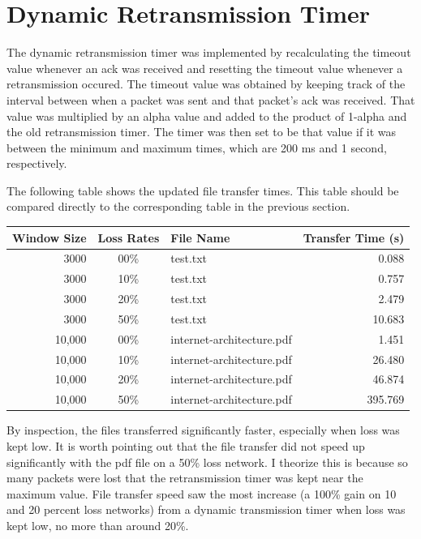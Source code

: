 \documentclass[11pt]{article}
\begin{document}
\section{Dynamic Retransmission Timer}

The dynamic retransmission timer was implemented by recalculating the timeout value whenever an ack was received and resetting the timeout value whenever a retransmission occured. The timeout value was obtained by keeping track of the interval between when a packet was sent and that packet's ack was received. That value was multiplied by an alpha value and added to the product of 1-alpha and the old retransmission timer. The timer was then set to be that value if it was between the minimum and maximum times, which are 200 ms and 1 second, respectively.

The following table shows the updated file transfer times. This table should be compared directly to the corresponding table in the previous section.

\vspace{0.5cm}
\begin{absolutelynopagebreak}
\begin{tabular}{rclr}
  \toprule
  Window Size & Loss Rates & File Name & Transfer Time (s) \\
  \midrule
  3000 & 00\% & test.txt &  0.088 \\
  3000 & 10\% & test.txt &  0.757 \\
  3000 & 20\% & test.txt &  2.479 \\
  3000 & 50\% & test.txt & 10.683 \\

  10,000 & 00\% & internet-architecture.pdf &   1.451 \\
  10,000 & 10\% & internet-architecture.pdf &  26.480 \\
  10,000 & 20\% & internet-architecture.pdf &  46.874 \\
  10,000 & 50\% & internet-architecture.pdf & 395.769 \\
  \bottomrule
\end{tabular}
\end{absolutelynopagebreak}
\vspace{0.5cm}

By inspection, the files transferred significantly faster, especially when loss was kept low. It is worth pointing out that the file transfer did not speed up significantly with the pdf file on a 50\% loss network. I theorize this is because so many packets were lost that the retransmission timer was kept near the maximum value. File transfer speed saw the most increase (a 100\% gain on 10 and 20 percent loss networks) from a dynamic transmission timer when loss was kept low, no more than around 20\%. 
\end{document}
